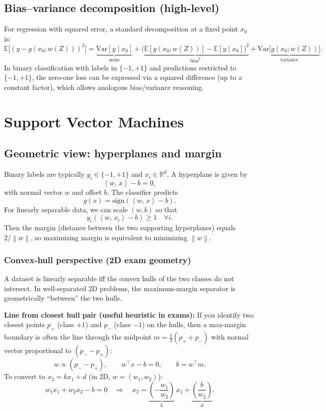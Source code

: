 \documentclass[11pt, oneside]{book}
\newcommand{\R}{\mathbb{R}}
\newcommand{\E}{\mathbb{E}}              %
\newcommand{\Var}{\mathrm{Var}}
\newcommand{\norm}[1]{\left\lVert #1 \right\rVert}
\newcommand{\inner}[2]{\left\langle #1,\, #2 \right\rangle}
\newcommand{\1}{\ind}                       %
\newcommand{\ip}[2]{\inner{#1}{#2}}        %
\begin{document}
\section{Bias--variance decomposition (high-level)}
For regression with squared error, a standard decomposition at a fixed point $x_0$ is:
\[
\E\big[(y-g(x_0;w(Z)))^2\big]
=
\underbrace{\Var[y\mid x_0]}_{\text{noise}}
+
\underbrace{\big(\E[g(x_0;w(Z))]-\E[y\mid x_0]\big)^2}_{\text{bias}^2}
+
\underbrace{\Var\big[g(x_0;w(Z))\big]}_{\text{variance}}.
\]
In binary classification with labels in $\{-1,+1\}$ and predictions restricted to $\{-1,+1\}$,
the zero-one loss can be expressed via a squared difference (up to a constant factor), which allows analogous bias/variance reasoning.

\chapter{Support Vector Machines}

\section{Geometric view: hyperplanes and margin}
Binary labels are typically $y_i\in\{-1,+1\}$ and $x_i\in\R^d$.
A hyperplane is given by
\[
  \ip{w}{x}-b=0,
\]
with normal vector $w$ and offset $b$.
The classifier predicts
\[
  g(x)=\mathrm{sign}(\ip{w}{x}-b).
\]
For linearly separable data, we can scale $(w,b)$ so that
\[
  y_i(\ip{w}{x_i}-b)\ge 1\quad \forall i.
\]
Then the margin (distance between the two supporting hyperplanes) equals $2/\norm{w}$, so maximizing margin is equivalent to minimizing $\norm{w}$.

\subsection{Convex-hull perspective (2D exam geometry)}
A dataset is linearly separable iff the convex hulls of the two classes do not intersect.
In well-separated 2D problems, the maximum-margin separator is geometrically ``between'' the two hulls.

\textbf{Line from closest hull pair (useful heuristic in exams):}
If you identify two closest points $p_+$ (class $+1$) and $p_-$ (class $-1$) on the hulls, then a max-margin boundary is often the line
through the midpoint $m=\frac12(p_+ + p_-)$ with normal vector proportional to $(p_- - p_+)$:
\[
w \propto (p_- - p_+),\qquad w^\top x - b = 0,\qquad b=w^\top m.
\]
To convert to $x_2=kx_1+d$ (in 2D, $w=(w_1,w_2)$):
\[
w_1 x_1 + w_2 x_2 - b = 0
\quad\Longrightarrow\quad
x_2 = \underbrace{\left(-\frac{w_1}{w_2}\right)}_{k}\,x_1 + \underbrace{\left(\frac{b}{w_2}\right)}_{d}.
\]
\end{document}
